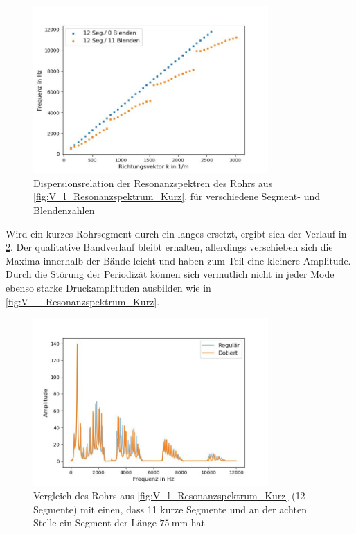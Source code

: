 \documentclass[../main.tex]{subfiles}
\begin{document}
        \begin{figure}[H]
            \centering
            \includegraphics[width=0.8\textwidth]{Bilddateien/Auswertung/V_l_Dispersionsrelation_Kurz.jpg}
            \caption{Dispersionsrelation der Resonanzspektren des Rohrs aus \ref{fig:V_l_Resonanzspektrum_Kurz}, für verschiedene Segment- und Blendenzahlen}
            \label{fig:V_l_Dispersionsrelation_Kurz}
        \end{figure}

        Wird ein kurzes Rohrsegment durch ein langes ersetzt, ergibt sich der Verlauf in \ref{fig:V_o_Resonanzspektrum_Dotiert}. Der qualitative Bandverlauf bleibt erhalten, allerdings verschieben sich die Maxima innerhalb der Bände leicht und haben zum Teil eine kleinere Amplitude. Durch die Störung der Periodizät können sich vermutlich nicht in jeder Mode ebenso starke Druckamplituden ausbilden wie in \ref{fig:V_l_Resonanzspektrum_Kurz}.

        \begin{figure}[H]
            \centering
            \includegraphics[width=0.8\textwidth]{Bilddateien/Auswertung/V_o_Resonanzspektrum_Dotiert.jpg}
            \caption{Vergleich des Rohrs aus \ref{fig:V_l_Resonanzspektrum_Kurz} (12 Segmente) mit einen, dass 11 kurze Segmente und an der achten Stelle ein Segment der Länge $\SI{75}{\milli\metre}$ hat}
            \label{fig:V_o_Resonanzspektrum_Dotiert}
        \end{figure}
\end{document}
